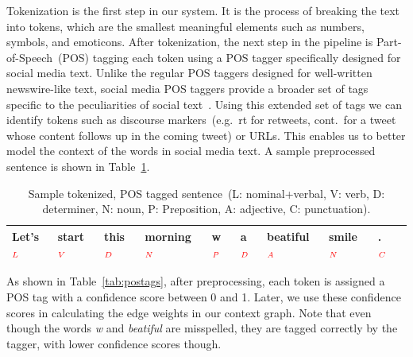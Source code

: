 \documentclass[a4paper,onesided,12pt]{report}
\begin{document}
Tokenization is the first step in our system. It is the process of breaking the text into tokens, which are the smallest meaningful elements such as numbers, symbols, and emoticons. After tokenization, the next step in the pipeline is Part-of-Speech~(POS) tagging each token using a POS tagger specifically designed for social media text. Unlike the regular POS taggers designed for well-written newswire-like text, social media POS taggers provide a broader set of tags specific to the peculiarities of social text~\cite{owoputi2013improved,Gimpel:2011:PTT:2002736.2002747}. Using this extended set of tags we can identify tokens such as discourse markers~(e.g.~rt for retweets, cont.~for a tweet whose content follows up in the coming tweet) or URLs. This enables us to better model the context of the words in social media text. A sample preprocessed sentence is shown in Table~\ref{tab:postagged}.

\begin{table}[tbhp]
\caption{Sample tokenized, POS tagged sentence~(L: nominal+verbal, V: verb, D: determiner, N: noun, P: Preposition, A: adjective, C: punctuation).}
\centering
\begin{tabular}{|l|l|l|l|l|l|l|l|l|l|}
\hline
Let's$_{\textcolor{red}{L}}$ & start$_{\textcolor{red}V}$ & this$_{\textcolor{red}D}$ & morning$_{\textcolor{red}N}$ & w$_{\textcolor{red}P}$ & a$_{\textcolor{red}D}$ & beatiful$_{\textcolor{red}A}$ & smile$_{\textcolor{red}N}$ & .$_{\textcolor{red}C}$\\
\hline
\end{tabular}
\label{tab:postagged}
\end{table}


As shown in Table~\ref{tab:postags}, after preprocessing, each token is assigned a POS tag with a confidence score between 0 and 1. Later, we use these confidence scores in calculating the edge weights in our context graph. Note that even though the words \emph{w} and\emph{ beatiful} are misspelled, they are tagged correctly by the tagger, with lower confidence scores though.
\end{document}
